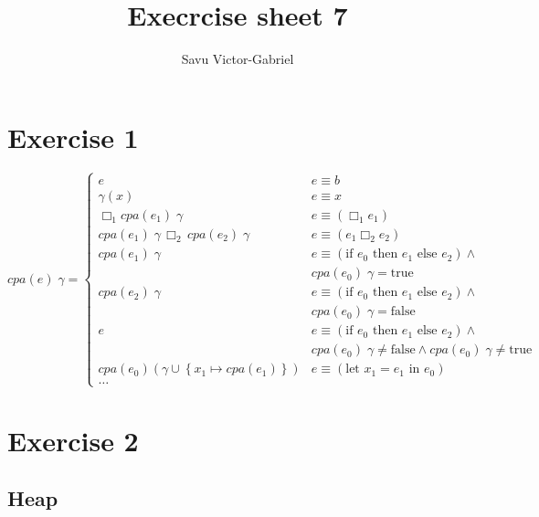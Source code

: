 \documentclass[10pt,a4paper]{article}
\title{Execrcise sheet 7}
\author{Savu Victor-Gabriel}
\begin{document}
	\maketitle
	
	\section{Exercise 1}
	
	\[
	cpa(e) \; \gamma =
	\begin{cases}
		e & 
		e \equiv b \\
		
		\gamma(x) & 
		e \equiv x \\
		
		\Box_1 cpa(e_1) \; \gamma & 
		e \equiv (\Box_1 e_1) \\
		
		cpa(e_1) \; \gamma \, \Box_2 \, cpa(e_2) \; \gamma & 
		e \equiv (e_1 \Box_2 e_2) \\
		
		cpa(e_1) \; \gamma & 
		e \equiv (\text{if } e_0 \text{ then } e_1 \text{ else } e_2) \wedge \\ 
		& cpa(e_0) \; \gamma = \text{true} \\
		
		cpa(e_2) \; \gamma & 
		e \equiv (\text{if } e_0 \text{ then } e_1 \text{ else } e_2) \wedge \\ 
		& cpa(e_0) \; \gamma = \text{false} \\
		
		e & 
		e \equiv (\text{if } e_0 \text{ then } e_1 \text{ else } e_2) \wedge \\
		& cpa(e_0) \; \gamma \neq \text{false} \wedge cpa(e_0) \; \gamma \neq \text{true} \\
		
		cpa(e_0) (\gamma \cup \left\lbrace x_1 \mapsto cpa(e_1) \right\rbrace ) &
		e \equiv (\text{let } x_1 = e_1 \text{ in } e_0) \\
		
		\dots
	\end{cases}
	\]
	
	\section{Exercise 2}
	
	\subsection{Heap}
	
\end{document}
